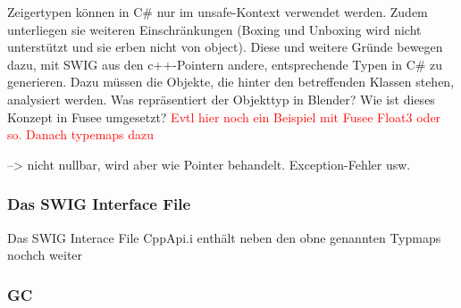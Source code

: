Zeigertypen können in C\# nur im unsafe-Kontext verwendet werden. Zudem unterliegen sie weiteren Einschränkungen (Boxing und Unboxing wird nicht unterstützt und sie erben nicht von object). Diese und weitere Gründe bewegen dazu, mit SWIG aus den c++-Pointern andere, entsprechende Typen in C\# zu generieren. Dazu müssen die Objekte, die hinter den betreffenden Klassen stehen, analysiert werden. Was repräsentiert der Objekttyp in Blender? Wie ist dieses Konzept in Fusee umgesetzt? \textcolor{red}{Evtl hier noch ein Beispiel mit Fusee Float3 oder so. Danach typemaps dazu}

--> nicht nullbar, wird aber wie Pointer behandelt. Exception-Fehler usw.

\subsubsection{Das SWIG Interface File}\label{subsubsec:Swiginterface}
Das SWIG Interace File CppApi.i enthält neben den obne genannten Typmaps nochch weiter 


\subsubsection{GC}\label{subsubsec:GC}

